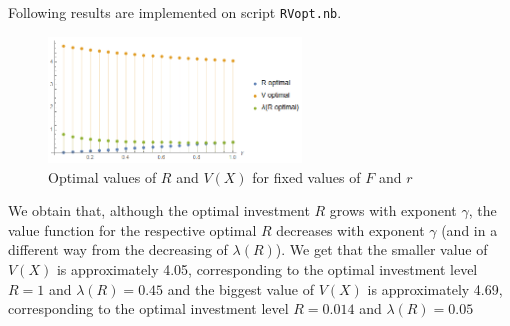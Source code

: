 Following results are implemented on script \texttt{RVopt.nb}.


\begin{figure}[!htb]
	\centering
	\includegraphics[width=0.6\textwidth]{Prob1_MaxProb/RVlambda_opt05.PNG}
	\caption{Optimal values of $R$ and $V(X)$ for fixed values of $F$ and $r$}
\end{figure}

We obtain that, although the optimal investment $R$ grows with exponent $\gamma$, the value function for the respective optimal $R$ decreases with exponent $\gamma$ (and in a different way from the decreasing of $\lambda(R)$). We get that the smaller value of $V(X)$ is approximately 4.05, corresponding to the optimal investment level $R=1$ and $\lambda(R)=0.45$ and the biggest value of $V(X)$ is approximately 4.69, corresponding to the optimal investment level $R=0.014$ and $\lambda(R)=0.05$















